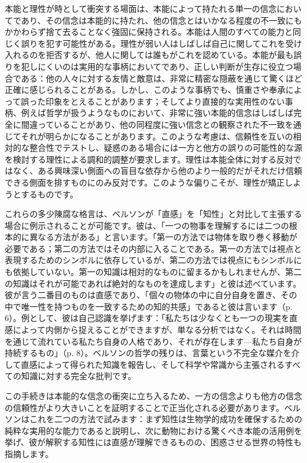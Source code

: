 \documentclass[a4paper,11pt,openany]{ltjsbook}
\begin{document}
本能と理性が時として衝突する場面は、本能によって持たれる単一の信念においてであり、その信念は本能的に持たれ、他の信念とはいかなる程度の不一致にもかかわらず捨て去ることなく強固に保持される。本能は人間のすべての能力と同じく誤りを犯す可能性がある。理性が弱い人はしばしば自己に関してこれを受け入れるのを拒否するが、他人に関しては誰もがこれを認めている。本能が最も誤りを犯しにくいのは実用的な事柄においてであり、正しい判断が生存に役立つ場合である：他の人々に対する友情と敵意は、非常に精密な隠蔽を通じて驚くほど正確に感じられることがある。しかし、このような事柄でも、慎重さや奉承によって誤った印象をとえることがあります；そしてより直接的な実用性のない事柄、例えば哲学が扱うようなものにおいて、非常に強い本能的信念はしばしば完全に間違っていることがあり、他の同程度に強い信念との観察された不一致を通じてそれが明らかになることがあります。このような考慮は、信頼性を互いの相対的な整合性でテストし、疑惑のある場合には一方と他方の誤りの可能性的な源を検討する理性による調和的調整が要求します。理性は本能全体に対する反対ではなく、ある興味深い側面への盲目な依存から他のより一般的だがそれだけ信頼できる側面を排すものにのみ反対です。このような偏りこそが、理性が矯正しようとするものです。

これらの多少陳腐な格言は、ベルソンが「直感」を「知性」と対比して主張する場合に例示されることが可能です。彼は、「一つの物事を理解するには二つの根本的に異なる方法がある」と言います。「第一の方法では物体を取り巻く移動が必要である；第二の方法ではその内部に入ることである。第一の方法では視点と表現するためのシンボルに依存しているが、第二の方法では視点にもシンボルにも依拠していない。第一の知識は相対的なものに留まるかもしれませんが、第二の知識はそれが可能であれば絶対的なものを達成します」と彼は述べています。彼が言う二番目のものは直感であり、「個々の物体の中に自分自身を置き、その中で唯一性を持つものを一致するための知的共感」であると彼は言います（p. 6）。例として、彼は自己認識を挙げます：「私たちは少なくとも一つの現実を直感によって内側から捉えることができますが、単なる分析ではなく。それは時間を通じて流れている私たち自身の人格であり、それが存在します—私たち自身が持続するもの」（p. 8）。ベルソンの哲学の残りは、言葉という不完全な媒介を介して直感によって得られた知識を報告し、そして科学や常識から主張されるすべての知識に対する完全な批判です。

この手続きは本能的な信念の衝突に立ち入るため、一方の信念よりも他方の信念の信頼性がより大きいことを証明することで正当化される必要があります。ベルソンはこれを二つの方法で試みます：まず知性は生物学的成功を確保するための純粋な実用的な能力であると説明し、次に動物における驚くべき本能の活用例を挙げ、彼が解釈する知性には直感が理解できるものの、困惑させる世界の特性も指摘します。
\end{document}
